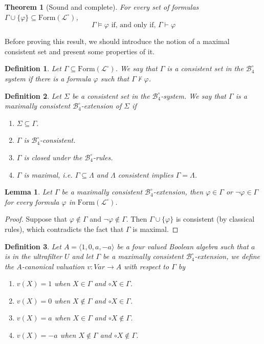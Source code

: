 \documentclass{amsart}
\newtheorem{definition}{Definition}[section]
\newtheorem{theorem}{Theorem}[section]
\newtheorem{lemma}{Lemma}[section]
\newcommand{\Lg}{\mathcal{L}}
\newcommand{\pair}[1]{\langle #1 \rangle}
\newcommand{\cl}{\mathcal{L}}
\newcommand{\B}{$\mathcal{B}_4^\circ$}
\newcommand{\For}{\mathrm{Form}}
\begin{document}
\begin{theorem}[Sound and complete]\label{sound-complete-10-classic}
    For every set of formulas $\Gamma \cup \{\varphi\}\subseteq \For(\cl^\circ)$,
    $$\Gamma \vDash \varphi \text{ if, and only if, } \Gamma \vdash \varphi$$
\end{theorem}

Before proving this result, we should introduce the notion of a maximal consistent set and present some properties of it.

\begin{definition}
    Let $\Gamma \subseteq \For(\cl^\circ)$. We say that $\Gamma$ is a consistent set in the \B system if there is a formula $\varphi$ such that $\Gamma \not \vdash \varphi$.
\end{definition}

\begin{definition}
    Let $\Sigma$ be a consistent set in the \B-system. We say that $\Gamma$ is a maximally consistent \B-extension of $\Sigma$ if
    \begin{enumerate}
        \item $\Sigma \subseteq \Gamma$.
        \item $\Gamma$ is \B-consistent.
        \item $\Gamma$ is closed under the \B-rules.
        \item $\Gamma$ is maximal, i.e. $\Gamma \subseteq \Lambda$ and $\Lambda$ consistent implies $\Gamma = \Lambda$.
    \end{enumerate}
\end{definition}

\begin{lemma}
    Let $\Gamma$ be a maximally consistent \B-extension, then $\varphi \in \Gamma$ or $\lnot \varphi \in \Gamma$ for every formula $\varphi$ in $\For(\Lg^\circ)$.
\end{lemma}

\begin{proof}
    Suppose that $\varphi \notin \Gamma$ and $\lnot \varphi \notin \Gamma$. Then $\Gamma\cup\{\varphi\}$ is consistent (by classical rules), which contradicts the fact that $\Gamma$ is maximal.
\end{proof}

\begin{definition}
    Let $A = \pair{1, 0, a, -a}$ be a four valued Boolean algebra such that $a$ is in the ultrafilter $U$ and let $\Gamma$ be a maximally consistent \B-extension, we define the $A$-canonical valuation $v:Var\to A$ with respect to $\Gamma$ by
    \begin{enumerate}
        \item $v(X) = 1$ when $X \in \Gamma$ and $\circ X \in \Gamma$.
        \item $v(X) = 0$ when $X \notin \Gamma$ and $\circ X \in \Gamma$.
        \item $v(X) = a$ when $X \in \Gamma$ and $\circ X \notin \Gamma$.
        \item $v(X) = -a$ when $X \notin \Gamma$ and $\circ X \notin \Gamma$.
    \end{enumerate}
\end{definition}
\end{document}
